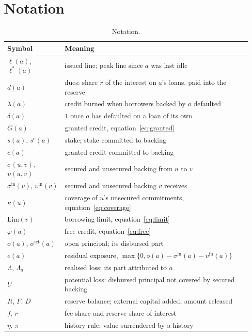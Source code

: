 \documentclass[acmsmall,nonacm,screen]{acmart}
\theoremstyle{acmdefinition}%
\newcommand{\Lim}{\mathrm{Lim}}
\newcommand{\sigin}{\sigma^{\mathrm{in}}}
\newcommand{\upsin}{\upsilon^{\mathrm{in}}}
\newcommand{\act}{\mathrm{act}}
\begin{document}



\appendix

\section{Notation}\label{app:notation}

\begin{table}[h]
  \caption{Notation.}
  \label{tab:notation}
  \centering\small
  \begin{tabular}{ll}
    \toprule
    Symbol & Meaning \\
    \midrule
    $\ell(a)$, $\ell^*(a)$ & issued line; peak line since $a$ was last idle \\
    $d(a)$ & dues: share $r$ of the interest on $a$'s loans, paid into the reserve \\
    $\lambda(a)$ & credit burned when borrowers backed by $a$ defaulted \\
    $\delta(a)$ & $1$ once $a$ has defaulted on a loan of its own \\
    $G(a)$ & granted credit, equation~\eqref{eq:granted} \\
    $s(a)$, $s^c(a)$ & stake; stake committed to backing \\
    $c(a)$ & granted credit committed to backing \\
    $\sigma(u,v)$, $\upsilon(u,v)$ & secured and unsecured backing from $u$ to $v$ \\
    $\sigin(v)$, $\upsin(v)$ & secured and unsecured backing $v$ receives \\
    $\kappa(u)$ & coverage of $u$'s unsecured commitments, equation~\eqref{eq:coverage} \\
    $\Lim(v)$ & borrowing limit, equation~\eqref{eq:limit} \\
    $\varphi(u)$ & free credit, equation~\eqref{eq:free} \\
    $o(a)$, $o^{\act}(a)$ & open principal; its disbursed part \\
    $e(a)$ & residual exposure, $\max\{0,o(a)-\sigin(a)-\upsin(a)\}$ \\
    $\Lambda$, $\Lambda_a$ & realised loss; its part attributed to $a$ \\
    $U$ & potential loss: disbursed principal not covered by secured backing \\
    $R$, $F$, $D$ & reserve balance; external capital added; amount released \\
    $f$, $r$ & fee share and reserve share of interest \\
    $\eta$, $\pi$ & history rule; value surrendered by a history \\
    \bottomrule
  \end{tabular}
\end{table}
\end{document}
